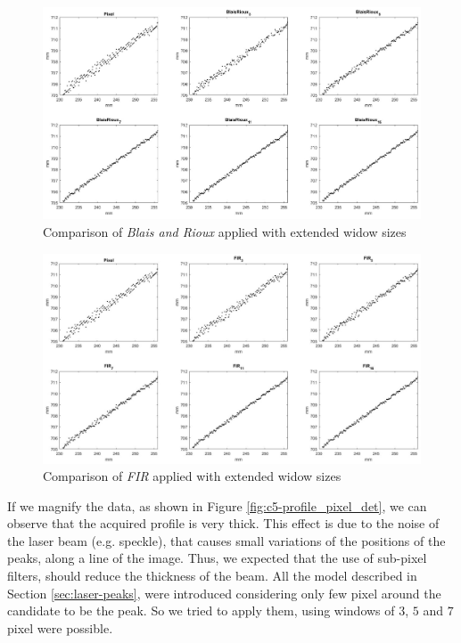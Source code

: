 \vfill
\begin{figure}
  \centering
  \includegraphics[width=\textwidth]{./images/analysis/t1/br6_cmp.jpg}
  \caption{Comparison of \textit{Blais and Rioux} applied with extended widow sizes}
  \label{fig:c5-br_cmp_6}
\end{figure}
\begin{figure}
  \centering
  \includegraphics[width=\textwidth]{./images/analysis/t1/fir6_cmp.jpg}
  \caption{Comparison of \textit{FIR} applied with extended widow sizes}
  \label{fig:c5-fir_cmp_6}
\end{figure}
\clearpage

If we magnify the data, as shown in Figure \ref{fig:c5-profile_pixel_det}, we can observe that the acquired profile is very thick. This effect is due to the noise of the laser beam (e.g. speckle), that causes small variations of the positions of the peaks, along a line of the image. Thus, we expected that the use of sub-pixel filters, should reduce the thickness of the beam. All the model described in Section \ref{sec:laser-peaks}, were introduced considering only few pixel around the candidate to be the peak. So we tried to apply them, using windows of $3$, $5$ and $7$ pixel were possible. \\

